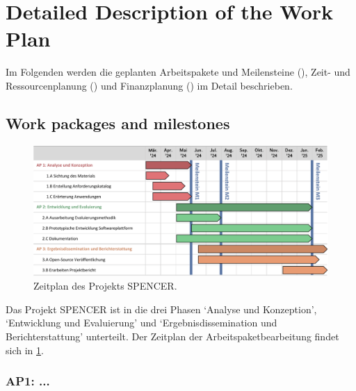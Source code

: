 \clearpage
\section{Detailed Description of the Work Plan}


Im Folgenden werden die geplanten Arbeitspakete und Meilensteine (), Zeit- und Ressourcenplanung () und Finanzplanung () im Detail beschrieben.

\subsection{Work packages and milestones}
\label{subsec:ap}

\begin{figure}
    \centering
    \includegraphics[width=\linewidth]{./graphs/gantt.pdf}
    \caption{Zeitplan des Projekts SPENCER.}
    \label{fig:gantt}
\end{figure}

Das Projekt SPENCER ist in die drei Phasen `Analyse und Konzeption', `Entwicklung und Evaluierung' und `Ergebnisdissemination und Berichterstattung' unterteilt.
Der Zeitplan der Arbeitspaketbearbeitung findet sich in \cref{fig:gantt}.

\subsubsection{AP1: ...}
\label{subsec:ap:1}

